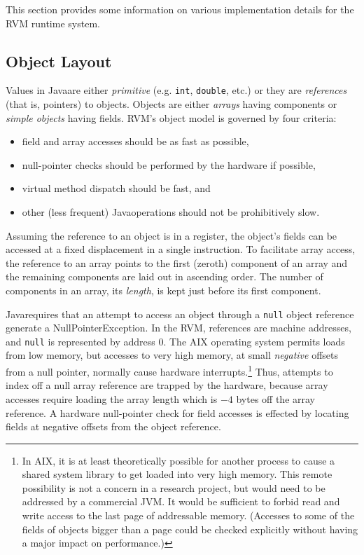 This section provides some information on various
implementation details for the RVM runtime system.

\subsection{Object Layout} \label{sssec:objects}
Values in Java\trademark are either {\em primitive} (e.g. {\tt int},
{\tt double}, etc.)  or they are {\em references} (that is, pointers) to
objects.  Objects are either {\em arrays} having components or {\em
simple objects} having fields.  RVM's object model is governed by four
criteria: 
\begin{itemize}
\item{}
field and array accesses should be as fast as possible,
\item{}
null-pointer checks should be performed by the hardware if possible, 
\item{}
virtual method dispatch should be fast, and 
\item{}
other (less frequent) Java\trademark operations  should not be prohibitively slow.
\end{itemize}

Assuming the reference to an object is in a register, the object's
fields can be accessed at a fixed displacement in a single
instruction.  To facilitate array access, the reference to an array
points to the first (zeroth) component of an array and the remaining
components are laid out in ascending order.  The number of components
in an array, its {\em length}, is kept just before its first
component.

Java\trademark requires that an attempt to access an object through a {\tt null}
object reference generate a NullPointerException.  In the RVM, references
are machine addresses, and {\tt null} is represented by address $0$.
The AIX operating system permits loads from low memory, but accesses
to very high memory, at small {\em negative} offsets from a null
pointer, normally cause hardware interrupts.\footnote{In AIX, it is at
least theoretically possible for another process to cause a shared
system library to get loaded into very high memory.  This remote
possibility is not a concern in a research project, but would need to
be addressed by a commercial JVM.  It would be sufficient to forbid
read and write access to the last page of addressable memory.
(Accesses to some of the fields of objects bigger than a page could be
checked explicitly without having a major impact on performance.)}
Thus, attempts to index off a null array reference are trapped by
the hardware, because array accesses require loading the array length
which is $-4$ bytes off the array reference.  A hardware null-pointer
check for field accesses is effected by locating fields at negative
offsets from the object reference.

